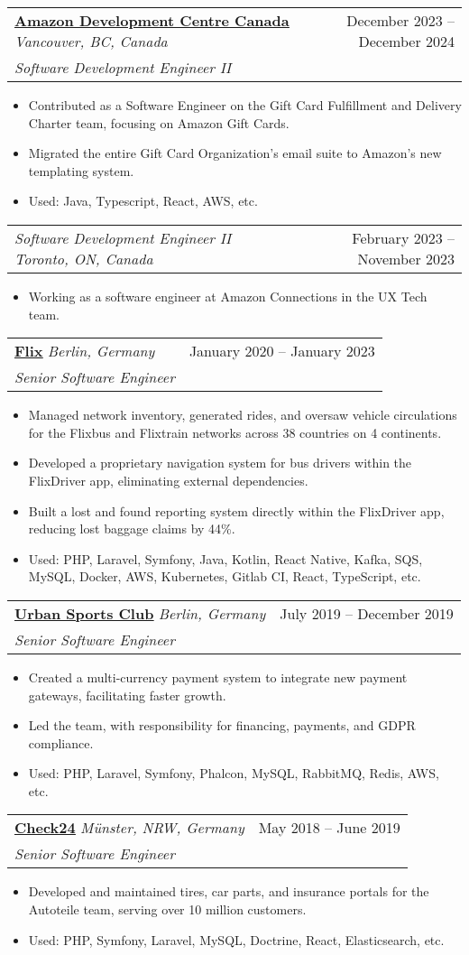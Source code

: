 \documentclass[a4paper,11pt]{article}
\makeatletter
\newcommand{\resumeSubheading}[4]{
  \vspace{1.5pt}\item
    \begin{tabular*}{0.97\textwidth}[t]{l@{\extracolsep{\fill}}r}
      \textbf{\large{#1}} \small{\textit{#4}} & #2 \\
      \textsl{#3}
    \end{tabular*}\vspace{-7pt}
}
\newcommand{\resumeSubSubheading}[2]{
    \vspace{-2pt}\item
    \begin{tabular*}{0.97\textwidth}{l@{\extracolsep{\fill}}r}
      \textsl{#1} & #2 \\
    \end{tabular*}\vspace{-7pt}
}
\newcommand{\resumeItemListStart}{\begin{itemize}}
\newcommand{\resumeItemListEnd}{\end{itemize}\vspace{-5pt}}
\newcommand{\resumeItem}[1]{
  \item\small{
    {#1 \vspace{-2pt}}
  }
}
\makeatother
\begin{document}
    \resumeSubheading
      {\href{https://amazon.com}{\underline{Amazon Development Centre Canada}}} {December 2023 -- December 2024}
      {Software Development Engineer II}{Vancouver, BC, Canada}
      \resumeItemListStart
        \resumeItem{Contributed as a Software Engineer on the Gift Card Fulfillment and Delivery Charter team, focusing on Amazon Gift Cards.}
        \resumeItem{Migrated the entire Gift Card Organization's email suite to Amazon's new templating system.}
        \resumeItem{Used: Java, Typescript, React, AWS, etc.}
      \resumeItemListEnd

      \resumeSubSubheading
        {Software Development Engineer II \small{\textit{Toronto, ON, Canada}}}{February 2023 -- November 2023}
        \resumeItemListStart
           \resumeItem{Working as a software engineer at Amazon Connections in the UX Tech team.}
        \resumeItemListEnd

    \resumeSubheading
      {\href{https://flix.com}{\underline{Flix}}} {January 2020 -- January 2023}
      {Senior Software Engineer}{Berlin, Germany}
      \resumeItemListStart
        \resumeItem{Managed network inventory, generated rides, and oversaw vehicle circulations for the Flixbus and Flixtrain networks across 38 countries on 4 continents.}
        \resumeItem{Developed a proprietary navigation system for bus drivers within the FlixDriver app, eliminating external dependencies.}
        \resumeItem{Built a lost and found reporting system directly within the FlixDriver app, reducing lost baggage claims by 44\%.}
        \resumeItem{Used: PHP, Laravel, Symfony, Java, Kotlin, React Native, Kafka, SQS, MySQL, Docker, AWS, Kubernetes, Gitlab CI, React, TypeScript, etc.}
      \resumeItemListEnd
      
    \resumeSubheading
      {\href{https://urbansportsclub.com}{\underline{Urban Sports Club}}}{July 2019 -- December 2019}
      {Senior Software Engineer}{Berlin, Germany}
      \resumeItemListStart
        \resumeItem{Created a multi-currency payment system to integrate new payment gateways, facilitating faster growth.}
        \resumeItem{Led the team, with responsibility for financing, payments, and GDPR compliance.}
        \resumeItem{Used: PHP, Laravel, Symfony, Phalcon, MySQL, RabbitMQ, Redis, AWS, etc.}
    \resumeItemListEnd

    \resumeSubheading
      {\href{http://check24.de}{\underline{Check24}}}{May 2018 -- June 2019}
      {Senior Software Engineer}{Münster, NRW, Germany}
      \resumeItemListStart
        \resumeItem{Developed and maintained tires, car parts, and insurance portals for the Autoteile team, serving over 10 million customers.}
        \resumeItem{Used: PHP, Symfony, Laravel, MySQL, Doctrine, React, Elasticsearch, etc.}
      \resumeItemListEnd
      
\end{document}
